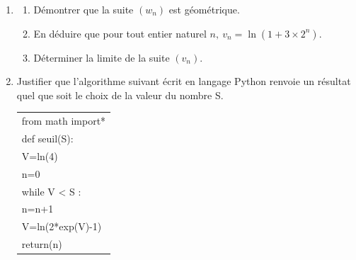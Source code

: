\begin{enumerate}[start=3]
\item
	\begin{enumerate}
		\item Démontrer que la suite $(w_n)$ est géométrique.
		\item En déduire que pour tout entier naturel $n, \: v_n = \ln \left(1 + 3 \times 2^n\right)$.
		\item Déterminer la limite de la suite $(v_n)$.
	\end{enumerate}
\item Justifier que l'algorithme suivant écrit en langage Python renvoie un résultat quel que soit le choix de la valeur du nombre S.

\begin{center}
\begin{ttfamily}
\begin{tabular}{|l|}\hline
from math import*\\
def seuil(S):\\
\qquad V=ln(4)\\
\qquad n=0\\
\qquad while V < S :\\
\qquad  \quad n=n+1\\
\qquad  \quad V=ln(2*exp(V)-1)\\
\qquad return(n)\\ \hline
\end{tabular}
\end{ttfamily}
\end{center}
\end{enumerate}


